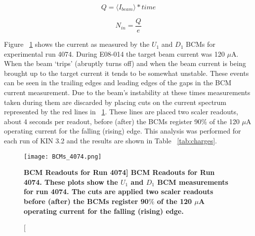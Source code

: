 \begin{equation} \label{eq:charge}
	Q = \langle I_{beam} \rangle *time
\end{equation}

\begin{equation} \label{eq:electrons}
	N_{in} = \frac{Q}{e}
\end{equation}

Figure ~\ref{fig:bcms_4074} shows the current as measured by the $U_1$ and $D_1$ BCMs for experimental run 4074. During E08-014 the target beam current was 120 $\mu$A. When the beam `trips' (abruptly turns off) and when the beam current is being brought up to the target current it tends to be somewhat unstable. These events can be seen in the trailing edges and leading edges of the gaps in the BCM current measurement. Due to the beam's instability at these times measurements taken during them are discarded by placing cuts on the current spectrum represented by the red lines in ~\ref{fig:bcms_4074}. These lines are placed two scaler readouts, about 4 seconds per readout, before (after) the BCMs register 90$\%$ of the 120 $\mu$A operating current for the falling (rising) edge. This analysis was performed for each run of KIN 3.2 and the results are shown in Table ~\ref{tab:charges}.

\begin{figure}[!ht]
\begin{center}
\texttt{[image: BCMs\_4074.png]}
\end{center}
\caption[\bf{BCM Readouts for Run 4074}]{
{\bf{BCM Readouts for Run 4074.}} These plots show the $U_1$ and $D_1$ BCM measurements for run 4074. The cuts are applied two scaler readouts before (after) the BCMs register 90$\%$ of the 120 $\mu$A operating current for the falling (rising) edge.}
\label{fig:bcms_4074}
\end{figure}

\vspace{5mm}

